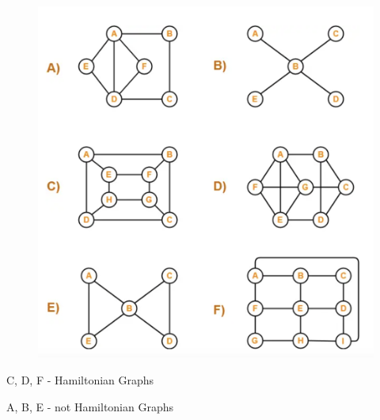 \documentclass{article}
\begin{document}
\begin{figure}[H]
	\centering
	\includegraphics[scale=0.7]{graph_practice}
\end{figure} 
\begin{flushleft}
C, D, F - Hamiltonian Graphs 

A, B, E - not Hamiltonian Graphs
\end{flushleft}
\end{document}
